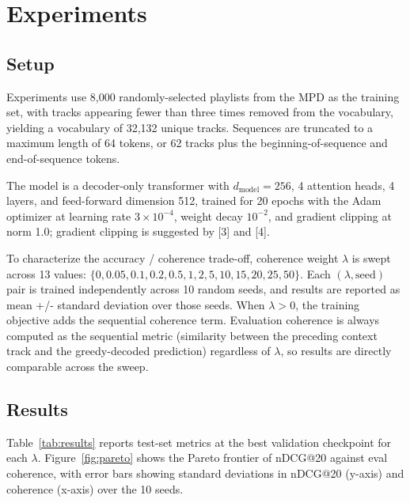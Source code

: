 \documentclass[conference]{IEEEtran}
\begin{document}
\section{Experiments}

\subsection{Setup}

Experiments use 8,000 randomly-selected playlists from the MPD as the training set, with tracks appearing fewer than three 
times removed from the vocabulary, yielding a vocabulary of 32,132 unique tracks. Sequences are truncated to a maximum length 
of 64 tokens, or 62 tracks plus the beginning-of-sequence and end-of-sequence tokens.

The model is a decoder-only transformer with $d_\text{model}=256$, 4 attention heads, 4 layers, and feed-forward dimension 512, 
trained for 20 epochs with the Adam optimizer at learning rate $3\times10^{-4}$, weight decay $10^{-2}$, and gradient clipping at norm 1.0; gradient
clipping is suggested by [3] and [4].

To characterize the accuracy / coherence trade-off, coherence weight $\lambda$ is swept across 13 values: 
$\{0, 0.05, 0.1, 0.2, 0.5, 1, 2, 5, 10, 15, 20, 25, 50\}$. Each $(\lambda, \text{seed})$ pair is trained independently 
across 10 random seeds, and results are reported as mean +/- standard deviation over those seeds. When $\lambda > 0$, 
the training objective adds the sequential coherence term. Evaluation coherence is always computed as the sequential 
metric (similarity between the preceding context track and the greedy-decoded prediction) regardless of $\lambda$, so results are directly comparable across the sweep.

\subsection{Results}

Table~\ref{tab:results} reports test-set metrics at the best validation checkpoint for each $\lambda$. 
Figure~\ref{fig:pareto} shows the Pareto frontier of nDCG@20 against eval coherence, with error bars showing standard deviations in 
nDCG@20 (y-axis) and coherence (x-axis) over the 10 seeds.
\end{document}
